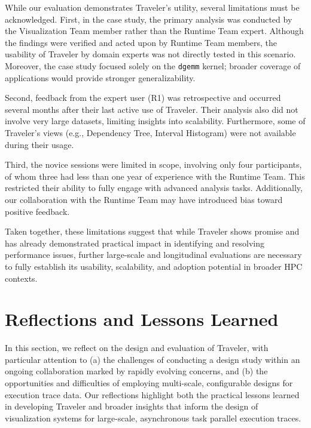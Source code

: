 \begin{refsection}
While our evaluation demonstrates Traveler's utility, several limitations must be acknowledged. First, in the case study, the primary analysis was conducted by the Visualization Team member rather than the Runtime Team expert. Although the findings were verified and acted upon by Runtime Team members, the usability of Traveler by domain experts was not directly tested in this scenario. Moreover, the case study focused solely on the \texttt{dgemm} kernel; broader coverage of applications would provide stronger generalizability.

Second, feedback from the expert user (R1) was retrospective and occurred several months after their last active use of Traveler. Their analysis also did not involve very large datasets, limiting insights into scalability. Furthermore, some of Traveler's views (e.g., Dependency Tree, Interval Histogram) were not available during their usage.

Third, the novice sessions were limited in scope, involving only four participants, of whom three had less than one year of experience with the Runtime Team. This restricted their ability to fully engage with advanced analysis tasks. Additionally, our collaboration with the Runtime Team may have introduced bias toward positive feedback.

Taken together, these limitations suggest that while Traveler shows promise and has already demonstrated practical impact in identifying and resolving performance issues, further large-scale and longitudinal evaluations are necessary to fully establish its usability, scalability, and adoption potential in broader HPC contexts.


\section{Reflections and Lessons Learned}
\label{sec:trav-reflection}

In this section, we reflect on the design and evaluation of Traveler, with particular attention to (a) the challenges of conducting a design study within an ongoing collaboration marked by rapidly evolving concerns, and (b) the opportunities and difficulties of employing multi-scale, configurable designs for execution trace data. Our reflections highlight both the practical lessons learned in developing Traveler and broader insights that inform the design of visualization systems for large-scale, asynchronous task parallel execution traces.


\end{refsection}
